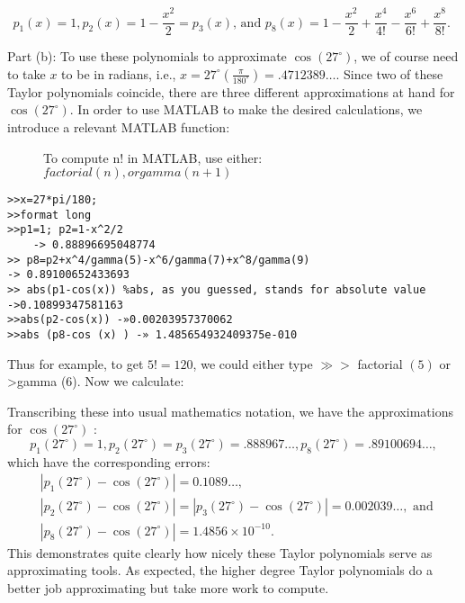 \documentclass[../main.tex]{subfiles}
\begin{document}
$$
p_{1}(x)=1, p_{2}(x)=1-\frac{x^{2}}{2}=p_{3}(x) \text {, and } p_{8}(x)=1-\frac{x^{2}}{2}+\frac{x^{4}}{4 !}-\frac{x^{6}}{6 !}+\frac{x^{8}}{8 !} \text {. }
$$

Part (b): To use these polynomials to approximate $\cos \left(27^{\circ}\right)$, we of course need to take $x$ to be in radians, i.e., $x=27^{\circ}\left(\frac{\pi}{180^{\circ}}\right)=.4712389 \ldots .$ Since two of these Taylor polynomials coincide, there are three different approximations at hand for $\cos \left(27^{\circ}\right)$. In order to use MATLAB to make the desired calculations, we introduce a relevant MATLAB function:

\begin{figure}[H]
\centering
\begin{boxedverbatim}
To compute n! in MATLAB, use either: $ factorial (n), or gamma (n+1)$
\end{boxedverbatim}
\end{figure}


\begin{verbatim}
>>x=27*pi/180;
>>format long
>>p1=1; p2=1-x^2/2
	-> 0.88896695048774
>> p8=p2+x^4/gamma(5)-x^6/gamma(7)+x^8/gamma(9)
-> 0.89100652433693
>> abs(p1-cos(x)) %abs, as you guessed, stands for absolute value
->0.10899347581163
>>abs(p2-cos(x)) -»0.00203957370062
>>abs (p8-cos (x) ) -» 1.485654932409375e-010 
\end{verbatim}

Thus for example, to get $5 !=120$, we could either type $\gg>$ factorial $(5)$ or >gamma (6). Now we calculate:

Transcribing these into usual mathematics notation, we have the approximations for $\cos \left(27^{\circ}\right)$ :
$$
p_{1}\left(27^{\circ}\right)=1, p_{2}\left(27^{\circ}\right)=p_{3}\left(27^{\circ}\right)=.888967 \ldots, p_{8}\left(27^{\circ}\right)=.89100694 \ldots,
$$
which have the corresponding errors:
$$
\begin{aligned}
&\left|p_{1}\left(27^{\circ}\right)-\cos \left(27^{\circ}\right)\right|=0.1089 \ldots, \\
&\left|p_{2}\left(27^{\circ}\right)-\cos \left(27^{\circ}\right)\right|=\left|p_{3}\left(27^{\circ}\right)-\cos \left(27^{\circ}\right)\right|=0.002039 \ldots, \text { and } \\
&\left|p_{8}\left(27^{\circ}\right)-\cos \left(27^{\circ}\right)\right|=1.4856 \times 10^{-10} .
\end{aligned}
$$
This demonstrates quite clearly how nicely these Taylor polynomials serve as approximating tools. As expected, the higher degree Taylor polynomials do a better job approximating but take more work to compute.\\
\end{document}
